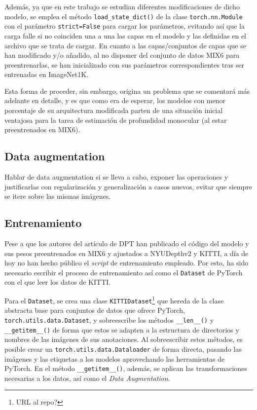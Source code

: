 Además, ya que en este trabajo se estudian diferentes modificaciones de dicho modelo, se emplea el método \texttt{load\_state\_dict()} de la clase \texttt{torch.nn.Module} con el parámetro \texttt{strict=False} para cargar los parámetros, evitando así que la carga falle si no coinciden una a una las capas en el modelo y las definidas en el archivo que se trata de cargar. En cuanto a las capas/conjuntos de capas que se han modificado y/o añadido, al no disponer del conjunto de datos MIX6 para preentrenarlas, se han inicializado con sus parámetros correspondientes tras ser entrenadas en ImageNet1K.

Esta forma de proceder, sin embargo, origina un problema que se comentará más adelante en detalle, y es que como era de esperar, los modelos con menor porcentaje de su arquitectura modificada parten de una situación inicial ventajosa para la tarea de estimación de profundidad monocular (al estar preentrenados en MIX6).

\subsection{Data augmentation}
Hablar de data augmentation si se lleva a cabo, exponer las operaciones y justificarlas con regularización y generalización a casos nuevos, evitar que siempre se itere sobre las mismas imágenes.

\subsection{Entrenamiento}
Pese a que los autores del artículo de DPT \cite{} han publicado el código del modelo y sus pesos preentrenados en MIX6 y ajustados a NYUDepthv2 y KITTI, a día de hoy no han hecho público el \textit{script} de entrenamiento empleado. Por esto, ha sido necesario escribir el proceso de entrenamiento así como el \texttt{Dataset} de PyTorch con el que leer los datos de KITTI.

Para el \texttt{Dataset}, se crea una clase \texttt{KITTIDataset}\footnote{URL al repo?} que hereda de la clase abstracta base para conjuntos de datos que ofrece PyTorch, \texttt{torch.utils.data.Dataset}, y sobreescribe los métodos \texttt{\_\_len\_\_()} y \texttt{\_\_getitem\_\_()} de forma que estos se adapten a la estructura de directorios y nombres de las imágenes de sus anotaciones. Al sobreescribir estos métodos, es posible crear un \texttt{torch.utils.data.Dataloader} de forma directa, pasando las imágenes y las etiquetas a los modelos aprovechando las herramientas de PyTorch. En el método \texttt{\_\_getitem\_\_()}, además, se aplican las transformaciones necesarias a los datos, así como el \textit{Data Augmentation}.

